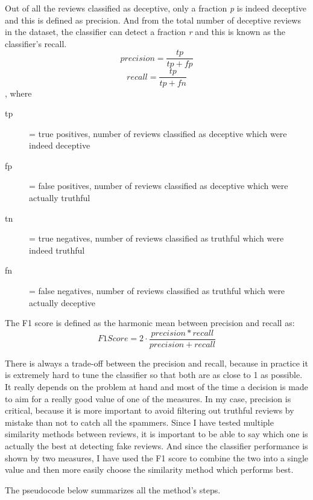 Out of all the reviews classified as deceptive, only a fraction \textit{p} is indeed deceptive and this is defined as precision. And from the total number of deceptive reviews in the dataset, the classifier can detect a fraction \textit{r} and this is known as the classifier’s recall. 
\begin{equation}
precision = \frac{tp}{tp + fp}
\end{equation}
\begin{equation}
recall = \frac{tp}{tp + fn} 
\end{equation}, where
\begin{description}
\item[tp] = true positives, number of reviews classified as deceptive which were indeed deceptive
\item[fp] = false positives, number of reviews classified as deceptive which were actually truthful
\item[tn] = true negatives, number of reviews classified as truthful which were indeed truthful
\item[fn] = false negatives, number of reviews classified as truthful which were actually deceptive
\end{description}

The F1 score is defined as the harmonic mean between precision and recall as:
\begin{equation}
F1Score =  2\cdot\frac{precision*recall}{precision+recall}
\end{equation}

There is always a trade-off between the precision and recall, because in practice it is extremely hard to tune the classifier so that both are as close to 1 as possible. It really depends on the problem at hand and most of the time a decision is made to aim for a really good value of one of the measures. In my case, precision is critical, because it is more important to avoid filtering out truthful reviews by mistake than not to catch all the spammers. 
Since I have tested multiple similarity methods between reviews, it is important to be able to say which one is actually the best at detecting fake reviews. And since the classifier performance is shown by two measures, I have used the F1 score to combine the two into a single value and then more easily choose the similarity method which performs best. 

The pseudocode below summarizes all the method's steps.

